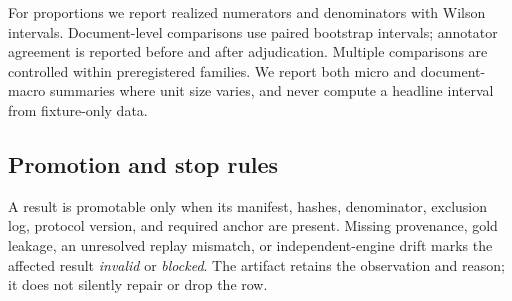 For proportions we report realized numerators and denominators with Wilson
intervals. Document-level comparisons use paired bootstrap intervals;
annotator agreement is reported before and after adjudication. Multiple
comparisons are controlled within preregistered families. We report both micro
and document-macro summaries where unit size varies, and never compute a
headline interval from fixture-only data.

\subsection{Promotion and stop rules}

A result is promotable only when its manifest, hashes, denominator, exclusion
log, protocol version, and required anchor are present. Missing provenance,
gold leakage, an unresolved replay mismatch, or independent-engine drift marks
the affected result \emph{invalid} or \emph{blocked}. The artifact retains the
observation and reason; it does not silently repair or drop the row.
